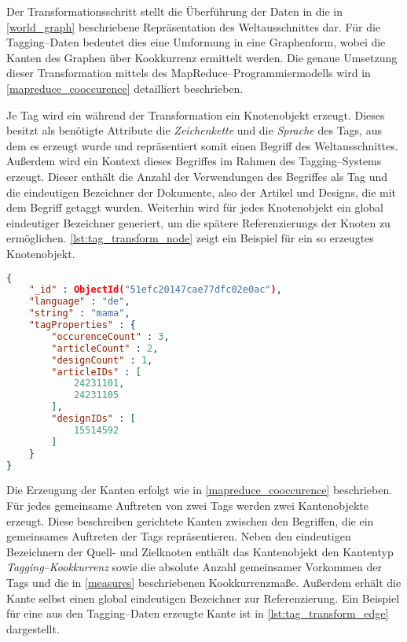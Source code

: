 Der Transformationsschritt stellt die Überführung der Daten in die in \cref{world_graph} beschriebene Repräsentation des Weltausschnittes dar. Für die Tagging--Daten bedeutet dies eine Umformung in eine Graphenform, wobei die Kanten des Graphen über Kookkurrenz ermittelt werden. Die genaue Umsetzung dieser Transformation mittels des MapReduce--Programmiermodells wird in \cref{mapreduce_cooccurence} detailliert beschrieben.

Je Tag wird ein während der Transformation ein Knotenobjekt erzeugt. Dieses besitzt als benötigte Attribute die \emph{Zeichenkette} und die \emph{Sprache} des Tags, aus dem es erzeugt wurde und repräsentiert somit einen Begriff des Weltausschnittes. Außerdem wird ein Kontext dieses Begriffes im Rahmen des Tagging--Systems erzeugt. Dieser enthält die Anzahl der Verwendungen des Begriffes als Tag und die eindeutigen Bezeichner der Dokumente, also der Artikel und Designs, die mit dem Begriff getaggt wurden. Weiterhin wird für jedes Knotenobjekt ein global eindeutiger Bezeichner generiert, um die spätere Referenzierungs der Knoten zu ermöglichen. \cref{lst:tag_transform_node} zeigt ein Beispiel für ein so erzeugtes Knotenobjekt.

\begin{lstlisting}[language=json, label={lst:tag_transform_node}, caption={JSON--Beispiel für einen aus den Tagging--Daten erzeugten Knoten}, float=h]
{
    "_id" : ObjectId("51efc20147cae77dfc02e0ac"),
    "language" : "de",
    "string" : "mama",
    "tagProperties" : {
        "occurenceCount" : 3,
        "articleCount" : 2,
        "designCount" : 1,
        "articleIDs" : [
            24231101,
            24231105
        ],
        "designIDs" : [
            15514592
        ]
    }
}
\end{lstlisting}

Die Erzeugung der Kanten erfolgt wie in \cref{mapreduce_cooccurence} beschrieben. Für jedes gemeinsame Auftreten von zwei Tags werden zwei Kantenobjekte erzeugt. Diese beschreiben gerichtete Kanten zwischen den Begriffen, die ein gemeinsames Auftreten der Tags repräsentieren. Neben den eindeutigen Bezeichnern der Quell- und Zielknoten enthält das Kantenobjekt den Kantentyp \emph{Tagging--Kookkurrenz} sowie die absolute Anzahl gemeinsamer Vorkommen der Tags und die in \cref{measures} beschriebenen Kookkurrenzmaße. Außerdem erhält die Kante selbst einen global eindeutigen Bezeichner zur Referenzierung. Ein Beispiel für eine aus den Tagging--Daten erzeugte Kante ist in \cref{lst:tag_transform_edge} dargestellt.

